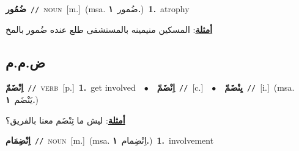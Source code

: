 \documentclass[10pt,a4paper,twoside]{article} %
\begin{document}
\begin{multicols}{2}
{\setlength\topsep{0pt}\textbf{\foreignlanguage{arabic}{ضُمُور}}\ {\color{gray}\texttt{//}\color{black}}\ \textsc{noun}\ [m.]\ \color{gray}(msa. \foreignlanguage{arabic}{ضُمور}~\foreignlanguage{arabic}{\textbf{١.}})\color{black}\ \textbf{1.}~atrophy\  \begin{flushright}\color{gray}\foreignlanguage{arabic}{\textbf{\underline{\foreignlanguage{arabic}{أمثلة}}}: المسكين منيمينه بالمستشفى طلع عنده ضُمور بالمخ}\end{flushright}\color{black}} \vspace{2mm}

\vspace{-3mm}
\subsection*{\color{blue}\foreignlanguage{arabic}{ض.م.م}\color{blue}{}} 

{\setlength\topsep{0pt}\textbf{\foreignlanguage{arabic}{اِنْضَمّ}}\ {\color{gray}\texttt{//}\color{black}}\ \textsc{verb}\ [p.]\ \textbf{1.}~get involved\ \ $\bullet$\ \ \setlength\topsep{0pt}\textbf{\foreignlanguage{arabic}{اِنْضَمّ}}\ {\color{gray}\texttt{//}\color{black}}\ [c.]\ \ $\bullet$\ \ \setlength\topsep{0pt}\textbf{\foreignlanguage{arabic}{يِنْضَمّ}}\ {\color{gray}\texttt{//}\color{black}}\ [i.]\ \color{gray}(msa. \foreignlanguage{arabic}{يَنْضَم}~\foreignlanguage{arabic}{\textbf{١.}})\color{black}\  \begin{flushright}\color{gray}\foreignlanguage{arabic}{\textbf{\underline{\foreignlanguage{arabic}{أمثلة}}}: ليش ما تِنْضَم معنا بالفريق؟}\end{flushright}\color{black}} \vspace{2mm}

{\setlength\topsep{0pt}\textbf{\foreignlanguage{arabic}{اِنْضِمَام}}\ {\color{gray}\texttt{//}\color{black}}\ \textsc{noun}\ [m.]\ \color{gray}(msa. \foreignlanguage{arabic}{اِنْضِمام}~\foreignlanguage{arabic}{\textbf{١.}})\color{black}\ \textbf{1.}~involvement\ } \vspace{2mm}


\end{multicols}
\end{document}
